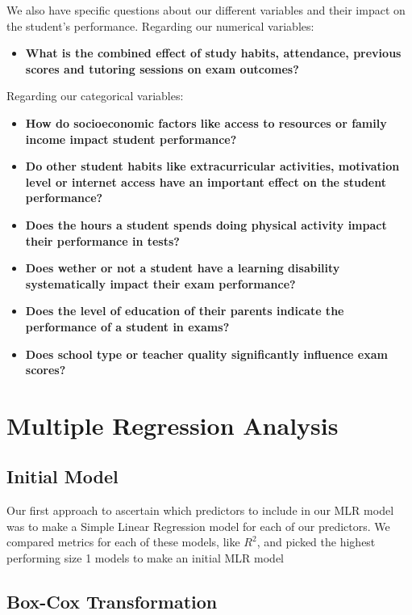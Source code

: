 \documentclass[twocolumn]{article} %
\begin{document}
We also have specific questions about our different variables and their impact on the student's performance.
\newline\newline
Regarding our numerical variables:
\begin{itemize}
\item
      \textbf{What is the combined effect of study habits, attendance, previous scores and tutoring sessions on exam outcomes?}
\end{itemize}
Regarding our categorical variables:
\begin{itemize}
\item
    \textbf{How do socioeconomic factors like access to resources or family income impact student performance?}
\item
    \textbf{Do other student habits like extracurricular activities, motivation level or internet access have an important effect on the student performance?}
\item
    \textbf{Does the hours a student spends doing physical activity impact their performance in tests?}
\item
    \textbf{Does wether or not a student have a learning disability systematically impact their exam performance?}
\item
    \textbf{Does the level of education of their parents indicate the performance of a student in exams?}
\item
    \textbf{Does school type or teacher quality significantly influence exam scores?}
\end{itemize}


\section{Multiple Regression Analysis}

\subsection*{Initial Model}
Our first approach to ascertain which predictors to include in our MLR model was to make a Simple Linear Regression model for each of our predictors. We compared metrics for each of these models, like $R^2$, and picked the highest performing size 1 models to make an initial MLR model %

\subsection*{Box-Cox Transformation}
\lipsum[1]
\end{document}
